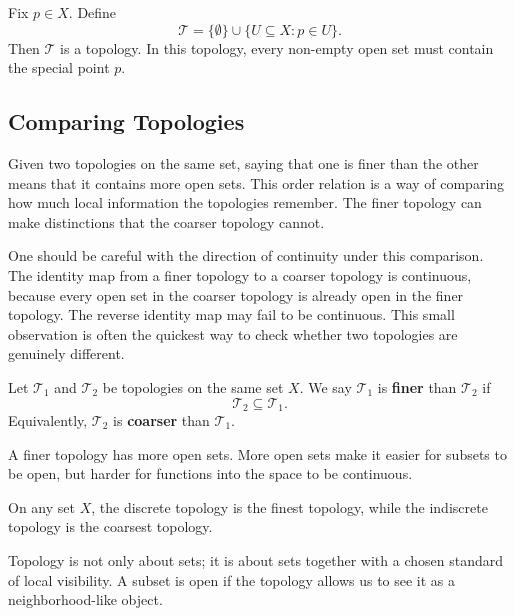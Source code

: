 \begin{example}
Fix $p\in X$. Define
\[
    \mathcal{T}=\{\emptyset\}\cup\{U\subseteq X:p\in U\}.
\]
Then $\mathcal{T}$ is a topology. In this topology, every non-empty open set must contain the special point $p$.
\end{example}

\subsection{Comparing Topologies}


Given two topologies on the same set, saying that one is finer than the other means that it contains more open sets. This order relation is a way of comparing how much local information the topologies remember. The finer topology can make distinctions that the coarser topology cannot.

One should be careful with the direction of continuity under this comparison. The identity map from a finer topology to a coarser topology is continuous, because every open set in the coarser topology is already open in the finer topology. The reverse identity map may fail to be continuous. This small observation is often the quickest way to check whether two topologies are genuinely different.

\begin{definition}
Let $\mathcal{T}_1$ and $\mathcal{T}_2$ be topologies on the same set $X$. We say $\mathcal{T}_1$ is \textbf{finer} than $\mathcal{T}_2$ if
\[
    \mathcal{T}_2\subseteq\mathcal{T}_1.
\]
Equivalently, $\mathcal{T}_2$ is \textbf{coarser} than $\mathcal{T}_1$.
\end{definition}

A finer topology has more open sets. More open sets make it easier for subsets to be open, but harder for functions into the space to be continuous.

\begin{example}
On any set $X$, the discrete topology is the finest topology, while the indiscrete topology is the coarsest topology.
\end{example}

\begin{remark}
Topology is not only about sets; it is about sets together with a chosen standard of local visibility. A subset is open if the topology allows us to see it as a neighborhood-like object.
\end{remark}


